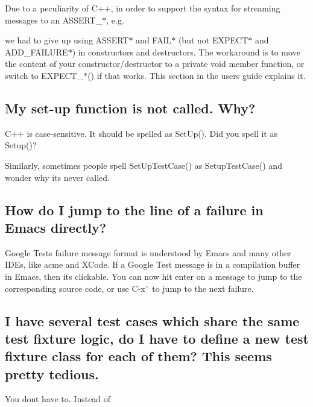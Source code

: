 Due to a peculiarity of C++, in order to support the syntax for streaming messages to an {\ttfamily A\+S\+S\+E\+R\+T\+\_\+$\ast$}, e.\+g.


\begin{DoxyCode}{0}
\end{DoxyCode}


we had to give up using {\ttfamily A\+S\+S\+E\+R\+T$\ast$} and {\ttfamily F\+A\+I\+L$\ast$} (but not {\ttfamily E\+X\+P\+E\+C\+T$\ast$} and {\ttfamily A\+D\+D\+\_\+\+F\+A\+I\+L\+U\+R\+E$\ast$}) in constructors and destructors. The workaround is to move the content of your constructor/destructor to a private void member function, or switch to {\ttfamily E\+X\+P\+E\+C\+T\+\_\+$\ast$()} if that works. This section in the user\textquotesingle{}s guide explains it.

\subsection*{My set-\/up function is not called. Why?}

C++ is case-\/sensitive. It should be spelled as {\ttfamily Set\+Up()}. Did you spell it as {\ttfamily Setup()}?

Similarly, sometimes people spell {\ttfamily Set\+Up\+Test\+Case()} as {\ttfamily Setup\+Test\+Case()} and wonder why it\textquotesingle{}s never called.

\subsection*{How do I jump to the line of a failure in Emacs directly?}

Google Test\textquotesingle{}s failure message format is understood by Emacs and many other I\+D\+Es, like acme and X\+Code. If a Google Test message is in a compilation buffer in Emacs, then it\textquotesingle{}s clickable. You can now hit {\ttfamily enter} on a message to jump to the corresponding source code, or use {\ttfamily C-\/x}\`{} to jump to the next failure.

\subsection*{I have several test cases which share the same test fixture logic, do I have to define a new test fixture class for each of them? This seems pretty tedious.}

You don\textquotesingle{}t have to. Instead of


